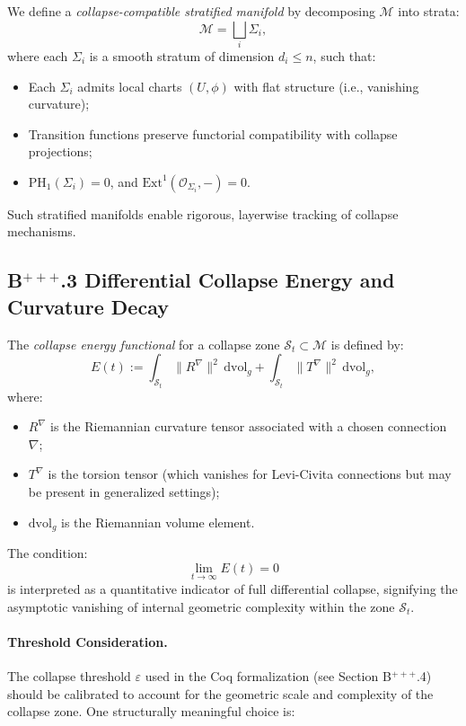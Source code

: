\documentclass[11pt]{article}
\begin{document}
We define a \emph{collapse-compatible stratified manifold} by decomposing \( \mathcal{M} \) into strata:
\[ \mathcal{M} = \bigsqcup_{i} \Sigma_i, \]
where each \( \Sigma_i \) is a smooth stratum of dimension \( d_i \leq n \), such that:

\begin{itemize}
  \item Each \( \Sigma_i \) admits local charts \( (U, \phi) \) with flat structure (i.e., vanishing curvature);
  \item Transition functions preserve functorial compatibility with collapse projections;
  \item \( \mathrm{PH}_1(\Sigma_i) = 0 \), and \( \mathrm{Ext}^1(\mathcal{O}_{\Sigma_i}, -) = 0 \).
\end{itemize}

Such stratified manifolds enable rigorous, layerwise tracking of collapse mechanisms.

\subsection*{B$^{+++}$.3 Differential Collapse Energy and Curvature Decay}

The \emph{collapse energy functional} for a collapse zone \( \mathcal{S}_t \subset \mathcal{M} \) is defined by:
\[
E(t) := \int_{\mathcal{S}_t} \| R^\nabla \|^2 \, \mathrm{dvol}_g + \int_{\mathcal{S}_t} \| T^\nabla \|^2 \, \mathrm{dvol}_g,
\]
where:
\begin{itemize}
  \item \( R^\nabla \) is the Riemannian curvature tensor associated with a chosen connection \( \nabla \);
  \item \( T^\nabla \) is the torsion tensor (which vanishes for Levi-Civita connections but may be present in generalized settings);
  \item \( \mathrm{dvol}_g \) is the Riemannian volume element.
\end{itemize}

The condition:
\[
\lim_{t \to \infty} E(t) = 0
\]
is interpreted as a quantitative indicator of full differential collapse, signifying the asymptotic vanishing of internal geometric complexity within the zone \( \mathcal{S}_t \).

\paragraph{Threshold Consideration.}
The collapse threshold \( \varepsilon \) used in the Coq formalization (see Section B$^{+++}$.4) should be calibrated to account for the geometric scale and complexity of the collapse zone. One structurally meaningful choice is:
\end{document}
